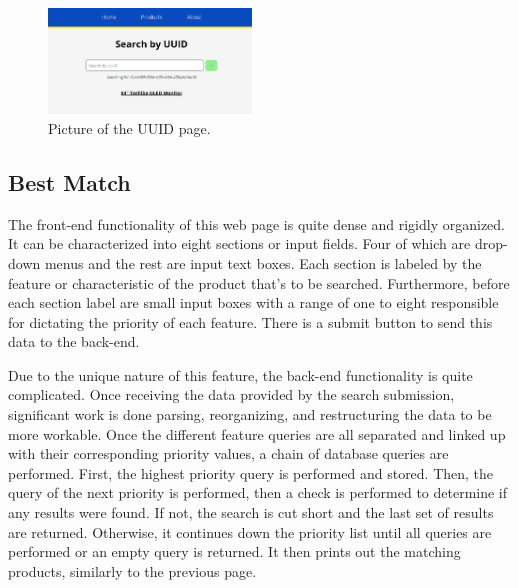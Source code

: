 \documentclass[sigconf]{acmart}
\begin{document}
\begin{figure}[H] %
	\centering %
	\includegraphics[width=0.48\textwidth]{Figures/exactmatch.png} %
	\caption{Picture of the UUID page.}
\end{figure}

\pagebreak
\subsection{Best Match}\label{best}
The front-end functionality of this web page is quite dense and rigidly organized. It can be characterized into eight sections or input fields.
Four of which are drop-down menus and the rest are input text boxes. Each section is labeled by the feature or characteristic of the product that's to be searched. Furthermore, before each section label are small input boxes with a range of one to eight responsible for dictating the priority of each feature. There is a submit button to send this data to the back-end. \par
Due to the unique nature of this feature, the back-end functionality is quite complicated. Once receiving the data provided by the search submission, significant work is done parsing, reorganizing, and restructuring the data to be more workable. Once the different feature queries are all separated and linked up with their corresponding priority values, a chain of database queries are performed. First, the highest priority query is performed and stored. Then, the query of the next priority is performed, then a check is performed to determine if any results were found. If not, the search is cut short and the last set of results are returned. Otherwise, it continues down the priority list until all queries are performed or an empty query is returned. It then prints out the matching products, similarly to the previous page.
\end{document}
